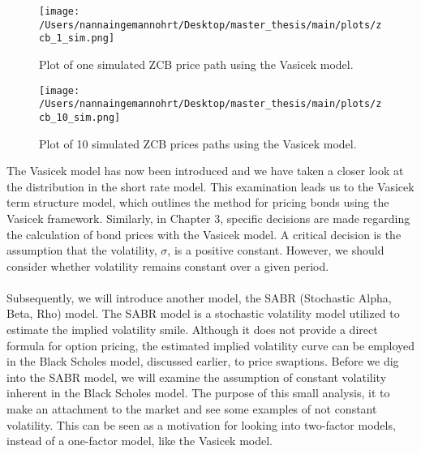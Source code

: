 \noindent
\begin{figure}[H]
    \centering
    \texttt{[image: /Users/nannaingemannohrt/Desktop/master\_thesis/main/plots/zcb\_1\_sim.png]}
    \caption{Plot of one simulated ZCB price path using the Vasicek model.}
    \label{fig:zcb_sim_1_plot}
\end{figure}
\noindent
\begin{figure}[H]
    \centering
    \texttt{[image: /Users/nannaingemannohrt/Desktop/master\_thesis/main/plots/zcb\_10\_sim.png]}
    \caption{Plot of 10 simulated  ZCB prices  paths using the Vasicek model.}
    \label{fig:zcb_sim_10_plot}
\end{figure}
\noindent
The Vasicek model has now been introduced and we have taken a closer look at the distribution in the short rate model. 
This examination leads us to the Vasicek term structure model, which outlines the method for pricing bonds using the 
Vasicek framework. Similarly, in Chapter 3, specific decisions are made regarding the calculation of bond prices with 
the Vasicek model. A critical decision is the assumption that the volatility, 
$\sigma$, is a positive constant. However, we should consider whether volatility remains constant over a given period.
\\\\
Subsequently, we will introduce another model, the SABR (Stochastic Alpha, Beta, Rho) model. The SABR model is a stochastic volatility model 
utilized to estimate the implied volatility smile. Although it does not provide a direct formula for option pricing, 
the estimated implied volatility curve can be employed in the Black Scholes model, discussed earlier, to price swaptions. 
Before we dig into the SABR model, we will examine the assumption of constant volatility inherent in the Black Scholes model.
The purpose of this small analysis, it to make an attachment to the
market and see some examples of not constant volatility. This can 
be seen as a motivation for looking into two-factor models, 
instead of a one-factor model, like the Vasicek model. 
